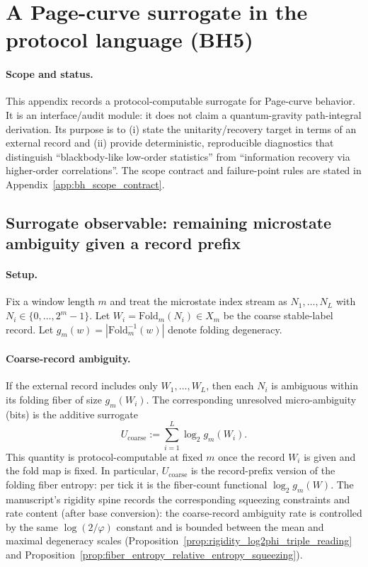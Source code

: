 \section{A Page-curve surrogate in the protocol language (BH5)}
\label{app:bh_page_surrogate}

\paragraph{Scope and status.}
\AuditTag This appendix records a protocol-computable surrogate for Page-curve behavior.
It is an interface/audit module: it does not claim a quantum-gravity path-integral derivation.
Its purpose is to (i) state the unitarity/recovery target in terms of an external record and
(ii) provide deterministic, reproducible diagnostics that distinguish
``blackbody-like low-order statistics'' from ``information recovery via higher-order correlations''.
The scope contract and failure-point rules are stated in Appendix~\ref{app:bh_scope_contract}.

\subsection{Surrogate observable: remaining microstate ambiguity given a record prefix}
\label{subsec:bh5_surrogate_definition}

\paragraph{Setup.}
Fix a window length $m$ and treat the microstate index stream as $N_1,\dots,N_L$ with
$N_i\in\{0,\dots,2^m-1\}$.
Let $W_i=\mathrm{Fold}_m(N_i)\in X_m$ be the coarse stable-label record.
Let $g_m(w)=|\mathrm{Fold}_m^{-1}(w)|$ denote folding degeneracy.

\paragraph{Coarse-record ambiguity.}
If the external record includes only $W_1,\dots,W_L$, then each $N_i$ is ambiguous within
its folding fiber of size $g_m(W_i)$.
The corresponding unresolved micro-ambiguity (bits) is the additive surrogate
\[
U_{\mathrm{coarse}}:=\sum_{i=1}^{L}\log_2 g_m(W_i).
\]
This quantity is protocol-computable at fixed $m$ once the record $W_i$ is given and the fold map is fixed.
\AuditTag In particular, $U_{\mathrm{coarse}}$ is the record-prefix version of the folding fiber entropy: per tick it is the fiber-count functional $\log_2 g_m(W)$.
The manuscript's rigidity spine records the corresponding squeezing constraints and rate content (after base conversion):
the coarse-record ambiguity rate is controlled by the same $\log(2/\varphi)$ constant and is bounded between the mean and maximal degeneracy scales (Proposition~\ref{prop:rigidity_log2phi_triple_reading} and Proposition~\ref{prop:fiber_entropy_relative_entropy_squeezing}).

